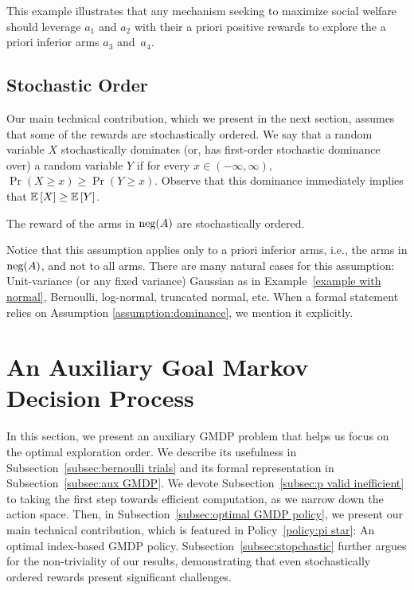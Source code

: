 This example illustrates that any mechanism seeking to maximize social welfare should leverage $a_1$ and $a_2$ with their a priori positive rewards to explore the a priori inferior arms $a_3$ and~$a_4$. 



\subsection{Stochastic Order}
Our main technical contribution, which we present in the next section, assumes that some of the rewards are stochastically ordered. We say that a random variable $X$ stochastically dominates (or, has first-order stochastic dominance over) a random variable $Y$ if for every $x\in (-\infty ,\infty ),$ $\Pr(X\geq x)\geq \Pr(Y\geq x)$. Observe that this dominance immediately implies that $\operatorname{\mathbb{E}}\left[X\right] \geq \operatorname{\mathbb{E}}\left[Y\right]$.
\begin{assumption}\label{assumption:dominance}
The reward of the arms in $\textnormal{neg}(A)$ are stochastically ordered.
\end{assumption}
Notice that this assumption applies only to a priori inferior arms, i.e., the arms in $\textnormal{neg}(A)$, and not to all arms. There are many natural cases for this assumption: Unit-variance (or any fixed variance) Gaussian as in Example~\ref{example with normal}, Bernoulli, log-normal, truncated normal, etc. When a formal statement relies on Assumption \ref{assumption:dominance}, we mention it explicitly. 



\section{An Auxiliary Goal Markov Decision Process}\label{sec:infinite}
In this section, we present an auxiliary GMDP problem that helps us focus on the optimal exploration order. We describe its usefulness in Subsection~\ref{subsec:bernoulli trials} and its formal representation in Subsection~\ref{subsec:aux GMDP}. We devote Subsection~\ref{subsec:p valid inefficient} to taking the first step towards efficient computation, as we narrow down the action space. Then, in Subsection~\ref{subsec:optimal GMDP policy}, we present our main technical contribution, which is featured in Policy~\ref{policy:pi star}: An optimal index-based GMDP policy. Subsection~\ref{subsec:stopchastic} further argues for the non-triviality of our results, demonstrating that even stochastically ordered rewards present significant challenges.


